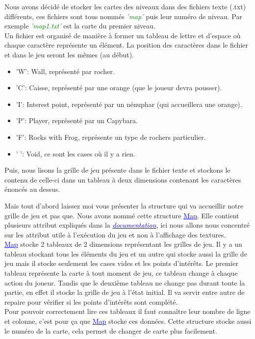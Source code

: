 \documentclass[french, 12pt]{article}
\begin{document}
       Nous avons décidé de stocker les cartes des niveaux dans des fichiers texte (.txt) différents, ces fichiers sont tous nommés \textcolor{green}{\textit{'map'}} puis leur numéro de niveau. Par exemple \textcolor{green}{\textit{'map1.txt'}} est la carte du premier niveau. \\
       Un fichier est organisé de manière à former un tableau de lettre et d'espace où chaque caractère représente un élément. La position des caractères dans le fichier et dans le jeu seront les mêmes (au début).
       \begin{itemize}
           \item 'W': Wall, représenté par rocher.
           \item 'C': Caisse, représenté par une orange (que le joueur devra pousser).
           \item 'I': Interest point, représenté par un nénuphar (qui accueillera une orange).
           \item 'P': Player, représenté par un Capybara.
           \item 'F': Rocks with Frog, représente un type de rochers particulier.
           \item ' ': Void, ce sont les cases où il y a rien.\\
       \end{itemize}


       Puis, nous lisons la grille de jeu présente dans le fichier texte et stockons le contenu de celle-ci dans un tableau à deux dimensions contenant les caractères énoncés au dessus.

       Mais tout d'abord laissez moi vous présenter la structure qui va accueillir notre grille de jeu et pas que. Nous avons nommé cette structure \href{../doc/html/struct_map.html}{\textcolor{blue}{\underline{Map}}}. Elle contient plusieurs attribut expliqués dans la \href{../doc/html/struct_map.html}{\textcolor{blue}{\textit{documentation}}}, ici nous allons nous concentré sur les attribut utile à l'exécution du jeu et non à l'affichage des textures. \\


       \href{../doc/html/struct_map.html}{\textcolor{blue}{\underline{Map}}} stocke 2 tableaux de 2 dimensions représentant les grilles de jeu. Il y a un tableau stockant tous les éléments du jeu et un autre qui stocke aussi la grille de jeu mais il stocke seulement les cases vides et les points d'intérêts. Le premier tableau représente la carte à tout moment de jeu, ce tableau change à chaque action du joueur. Tandis que le deuxième tableau ne change pas durant toute la partie, en effet il stocke la grille de jeu à l'état initial. Il va servir entre autre de repaire pour vérifier si les points d'intérêts sont complété.\\
       Pour pouvoir correctement lire ces tableaux il faut connaître leur nombre de ligne et colonne, c'est pour ça que \href{../doc/html/struct_map.html}{\textcolor{blue}{\underline{Map}}} stocke ces données. Cette structure stocke aussi le numéro de la carte, cela permet de changer de carte plus facilement.
\end{document}
